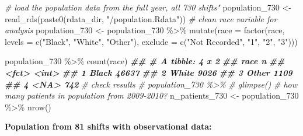 \documentclass[
]{article}
\newenvironment{Shaded}{\begin{snugshade}}{\end{snugshade}}
\newcommand{\AttributeTok}[1]{\textcolor[rgb]{0.77,0.63,0.00}{#1}}
\newcommand{\CommentTok}[1]{\textcolor[rgb]{0.56,0.35,0.01}{\textit{#1}}}
\newcommand{\DocumentationTok}[1]{\textcolor[rgb]{0.56,0.35,0.01}{\textbf{\textit{#1}}}}
\newcommand{\FunctionTok}[1]{\textcolor[rgb]{0.00,0.00,0.00}{#1}}
\newcommand{\NormalTok}[1]{#1}
\newcommand{\OtherTok}[1]{\textcolor[rgb]{0.56,0.35,0.01}{#1}}
\newcommand{\SpecialCharTok}[1]{\textcolor[rgb]{0.00,0.00,0.00}{#1}}
\newcommand{\StringTok}[1]{\textcolor[rgb]{0.31,0.60,0.02}{#1}}
\begin{document}
\begin{Shaded}
\begin{Highlighting}[]
\CommentTok{\# load the population data from the full year, all 730 shifts"}
\NormalTok{population\_730 }\OtherTok{\textless{}{-}} \FunctionTok{read\_rds}\NormalTok{(}\FunctionTok{paste0}\NormalTok{(rdata\_dir, }\StringTok{"/population.Rdata"}\NormalTok{))}
\CommentTok{\# clean race variable for analysis}
\NormalTok{population\_730 }\OtherTok{\textless{}{-}}\NormalTok{ population\_730 }\SpecialCharTok{\%\textgreater{}\%}
  \FunctionTok{mutate}\NormalTok{(}\AttributeTok{race =} \FunctionTok{factor}\NormalTok{(race,}
              \AttributeTok{levels =} \FunctionTok{c}\NormalTok{(}\StringTok{"Black"}\NormalTok{,}
                         \StringTok{"White"}\NormalTok{,}
                         \StringTok{"Other"}\NormalTok{),}
              \AttributeTok{exclude =} \FunctionTok{c}\NormalTok{(}\StringTok{"Not Recorded"}\NormalTok{, }\StringTok{"1"}\NormalTok{, }\StringTok{"2"}\NormalTok{, }\StringTok{"3"}\NormalTok{)))}

\NormalTok{population\_730 }\SpecialCharTok{\%\textgreater{}\%} 
    \FunctionTok{count}\NormalTok{(race)}
\DocumentationTok{\#\# \# A tibble: 4 x 2}
\DocumentationTok{\#\#   race      n}
\DocumentationTok{\#\#   \textless{}fct\textgreater{} \textless{}int\textgreater{}}
\DocumentationTok{\#\# 1 Black 46637}
\DocumentationTok{\#\# 2 White  9026}
\DocumentationTok{\#\# 3 Other  1109}
\DocumentationTok{\#\# 4 \textless{}NA\textgreater{}    742}
\CommentTok{\# check results}
\CommentTok{\# population\_730 \%\textgreater{}\% }
  \CommentTok{\# glimpse()}
\CommentTok{\# how many patients in population from 2009{-}2010?}
\NormalTok{n\_patients\_730 }\OtherTok{\textless{}{-}}\NormalTok{ population\_730 }\SpecialCharTok{\%\textgreater{}\%}
  \FunctionTok{nrow}\NormalTok{()}
\end{Highlighting}
\end{Shaded}

\textbf{Population from 81 shifts with observational data:}
\end{document}

